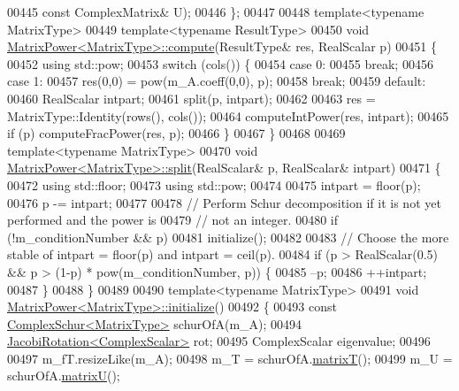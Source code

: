 \begin{DoxyCode}
00445         \textcolor{keyword}{const} ComplexMatrix& U);
00446 \};
00447 
00448 \textcolor{keyword}{template}<\textcolor{keyword}{typename} MatrixType>
00449 \textcolor{keyword}{template}<\textcolor{keyword}{typename} ResultType>
00450 \textcolor{keywordtype}{void} \hyperlink{class_eigen_1_1_matrix_power_aa1258393dc13acd6e401e000f99b915f}{MatrixPower<MatrixType>::compute}(ResultType& res, RealScalar p)
00451 \{
00452   \textcolor{keyword}{using} std::pow;
00453   \textcolor{keywordflow}{switch} (cols()) \{
00454     \textcolor{keywordflow}{case} 0:
00455       \textcolor{keywordflow}{break};
00456     \textcolor{keywordflow}{case} 1:
00457       res(0,0) = pow(m\_A.coeff(0,0), p);
00458       \textcolor{keywordflow}{break};
00459     \textcolor{keywordflow}{default}:
00460       RealScalar intpart;
00461       split(p, intpart);
00462 
00463       res = MatrixType::Identity(rows(), cols());
00464       computeIntPower(res, intpart);
00465       \textcolor{keywordflow}{if} (p) computeFracPower(res, p);
00466   \}
00467 \}
00468 
00469 \textcolor{keyword}{template}<\textcolor{keyword}{typename} MatrixType>
00470 \textcolor{keywordtype}{void} \hyperlink{class_eigen_1_1_matrix_power}{MatrixPower<MatrixType>::split}(RealScalar& p, RealScalar& intpart)
00471 \{
00472   \textcolor{keyword}{using} std::floor;
00473   \textcolor{keyword}{using} std::pow;
00474 
00475   intpart = floor(p);
00476   p -= intpart;
00477 
00478   \textcolor{comment}{// Perform Schur decomposition if it is not yet performed and the power is}
00479   \textcolor{comment}{// not an integer.}
00480   \textcolor{keywordflow}{if} (!m\_conditionNumber && p)
00481     initialize();
00482 
00483   \textcolor{comment}{// Choose the more stable of intpart = floor(p) and intpart = ceil(p).}
00484   \textcolor{keywordflow}{if} (p > RealScalar(0.5) && p > (1-p) * pow(m\_conditionNumber, p)) \{
00485     --p;
00486     ++intpart;
00487   \}
00488 \}
00489 
00490 \textcolor{keyword}{template}<\textcolor{keyword}{typename} MatrixType>
00491 \textcolor{keywordtype}{void} \hyperlink{class_eigen_1_1_matrix_power}{MatrixPower<MatrixType>::initialize}()
00492 \{
00493   \textcolor{keyword}{const} \hyperlink{group___eigenvalues___module}{ComplexSchur<MatrixType>} schurOfA(m\_A);
00494   \hyperlink{group___jacobi___module_class_eigen_1_1_jacobi_rotation}{JacobiRotation<ComplexScalar>} rot;
00495   ComplexScalar eigenvalue;
00496 
00497   m\_fT.resizeLike(m\_A);
00498   m\_T = schurOfA.\hyperlink{group___eigenvalues___module_add3ab5ed83f7f2f06b79fa910a2d5684}{matrixT}();
00499   m\_U = schurOfA.\hyperlink{group___eigenvalues___module_afed8177cf9836f032d42bdb6c6bc6e01}{matrixU}();

\end{DoxyCode}
